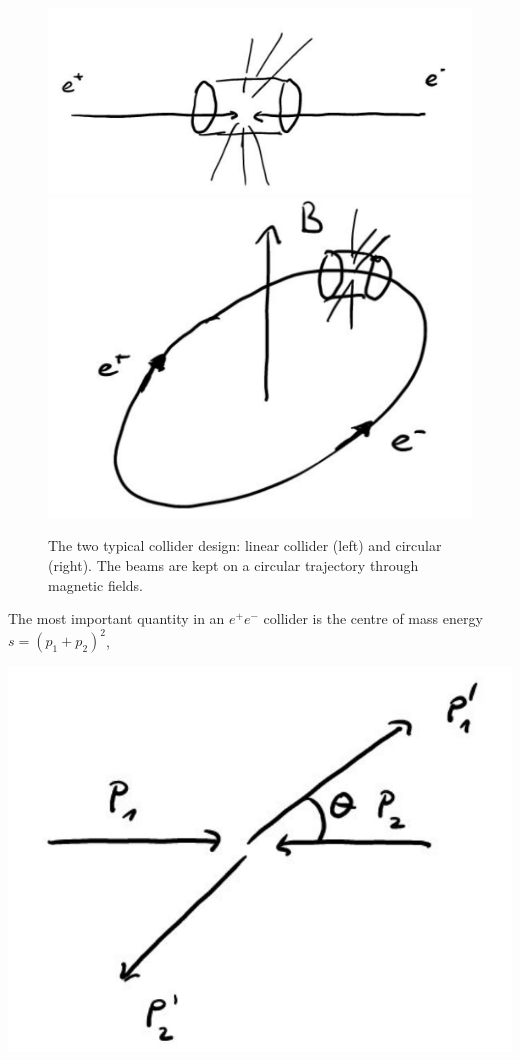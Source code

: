 \documentclass[12pt]{article}
\begin{document}
\begin{figure}
\begin{center}
\includegraphics[scale=0.2]{images/LinearCollider.png}
\includegraphics[scale=0.2]{images/CircularCollider.png}
\end{center}
\caption{The two typical collider design: linear collider (left) and circular (right). The beams are kept on a circular trajectory through magnetic fields.}\label{fig:colliders}
\end{figure}
The most important quantity in an $e^+e^-$ collider is the centre of mass energy $s=(p_1+p_2)^2$,
\begin{center}
\includegraphics[scale=0.2]{images/epemKinematics.png}
\end{center}
\end{document}
